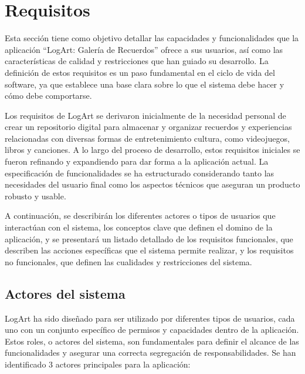 \section{Requisitos}
\label{sec:requisitos}

Esta sección tiene como objetivo detallar las capacidades y funcionalidades que la aplicación ``LogArt: Galería de Recuerdos'' ofrece a sus usuarios, así como las características de calidad y restricciones que han guiado su desarrollo. La definición de estos requisitos es un paso fundamental en el ciclo de vida del software, ya que establece una base clara sobre lo que el sistema debe hacer y cómo debe comportarse.

Los requisitos de LogArt se derivaron inicialmente de la necesidad personal de crear un repositorio digital para almacenar y organizar recuerdos y experiencias relacionadas con diversas formas de entretenimiento cultura, como videojuegos, libros y canciones. A lo largo del proceso de desarrollo, estos requisitos iniciales se fueron refinando y expandiendo para dar forma a la aplicación actual. La especificación de funcionalidades se ha estructurado considerando tanto las necesidades del usuario final como los aspectos técnicos que aseguran un producto robusto y usable.

A continuación, se describirán los diferentes actores o tipos de usuarios que interactúan con el sistema, los conceptos clave que definen el domino de la aplicación, y se presentará un listado detallado de los requisitos funcionales, que describen las acciones específicas que el sistema permite realizar, y los requisitos no funcionales, que definen las cualidades y restricciones del sistema.

\subsection{Actores del sistema}
\label{ssec:actoresSistema}

LogArt ha sido diseñado para ser utilizado por diferentes tipos de usuarios, cada uno con un conjunto específico de permisos y capacidades dentro de la aplicación. Estos roles, o actores del sistema, son fundamentales para definir el alcance de las funcionalidades y asegurar una correcta segregación de responsabilidades. Se han identificado 3 actores principales para la aplicación:

